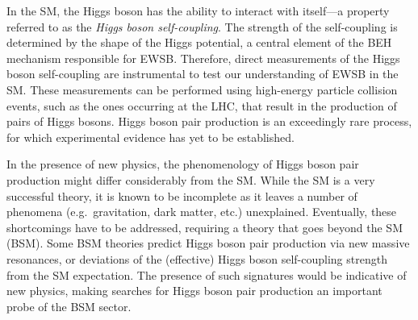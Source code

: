 In the SM, the Higgs boson has the ability to interact with itself---a property
referred to as the \emph{Higgs boson self-coupling}. The strength of the
self-coupling is determined by the shape of the Higgs potential, a central
element of the BEH mechanism responsible for EWSB.
Therefore, direct measurements of the Higgs boson self-coupling are instrumental
to test our understanding of EWSB in the SM. These measurements can be performed
using high-energy particle collision events, such as the ones occurring at the
LHC, that result in the production of pairs of Higgs bosons. Higgs boson pair
production is an exceedingly rare process, for which experimental evidence has
yet to be established.


In the presence of new physics, the phenomenology of Higgs boson pair production
might differ considerably from the SM. While the SM is a very successful theory,
it is known to be incomplete as it leaves a number of phenomena (e.g.\
gravitation, dark matter, etc.) unexplained. Eventually, these shortcomings have
to be addressed, requiring a theory that goes beyond the SM (BSM). Some BSM
theories predict Higgs boson pair production via new massive resonances, or
deviations of the (effective) Higgs boson self-coupling strength from the SM
expectation. The presence of such signatures would be indicative of new physics,
making searches for Higgs boson pair production an important probe of the BSM
sector.




